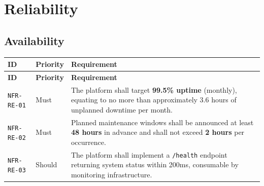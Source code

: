 \documentclass[12pt,a4paper]{article}
\begin{document}
\section{Reliability}

\subsection{Availability}
\begin{longtable}{L{2.2cm} L{1.8cm} L{9.3cm}}
  \color{white}\bfseries ID & \color{white}\bfseries Priority & \color{white}\bfseries Requirement \\
  \endfirsthead
  \color{white}\bfseries ID & \color{white}\bfseries Priority & \color{white}\bfseries Requirement \\
  \endhead\hline
  \texttt{NFR-RE-01} & Must   & The platform shall target \textbf{99.5\% uptime} (monthly), equating to no more than approximately 3.6 hours of unplanned downtime per month. \\
  \texttt{NFR-RE-02} & Must   & Planned maintenance windows shall be announced at least \textbf{48 hours} in advance and shall not exceed \textbf{2 hours} per occurrence. \\
  \texttt{NFR-RE-03} & Should & The platform shall implement a \texttt{/health} endpoint returning system status within 200ms, consumable by monitoring infrastructure. \\
  \hline
\end{longtable}
\end{document}
